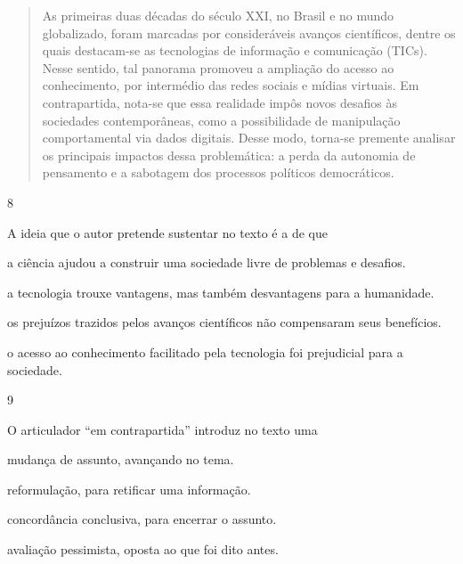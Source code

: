 \begin{quote}
As primeiras duas décadas do século XXI, no Brasil e no mundo
globalizado, foram marcadas por consideráveis avanços científicos,
dentre os quais destacam-se as tecnologias de informação e comunicação
(TICs). Nesse sentido, tal panorama promoveu a ampliação do acesso ao
conhecimento, por intermédio das redes sociais e mídias virtuais. Em
contrapartida, nota-se que essa realidade impôs novos desafios às
sociedades contemporâneas, como a possibilidade de manipulação
comportamental via dados digitais. Desse modo, torna-se premente
analisar os principais impactos dessa problemática: a perda da autonomia
de pensamento e a sabotagem dos processos políticos democráticos.
\end{quote}


\num{8}

A ideia que o autor pretende sustentar no texto é a de que

\begin{escolha}
\item a ciência ajudou a construir uma sociedade livre de problemas e
desafios.

\item a tecnologia trouxe vantagens, mas também desvantagens para a
humanidade.

\item os prejuízos trazidos pelos avanços científicos não compensaram seus
benefícios.

\item o acesso ao conhecimento facilitado pela tecnologia foi prejudicial
para a sociedade.
\end{escolha}

\num{9}

O articulador ``em contrapartida'' introduz no texto uma

\begin{escolha}
\item mudança de assunto, avançando no tema.

\item reformulação, para retificar uma informação.

\item concordância conclusiva, para encerrar o assunto.

\item avaliação pessimista, oposta ao que foi dito antes.
\end{escolha}

